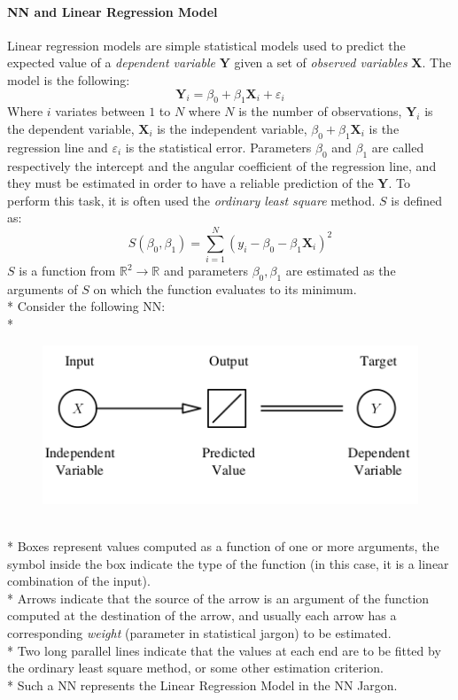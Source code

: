 \documentclass[10pt,a4paper]{article}
\begin{document}
	\paragraph{NN and Linear Regression Model}
	Linear regression models are simple statistical models used to predict the expected value of a \emph{dependent variable} $\textbf{Y}$ given a set of \emph{observed variables} $\textbf{X}$. The model is the following:
	$$
	\textbf{Y}_i = \beta_0 + \beta_1 \textbf{X}_i + \varepsilon_i
	$$
	Where $i$ variates between $1$ to $N$ where $N$ is the number of observations, $\textbf{Y}_i$ is the dependent variable, $\textbf{X}_i$ is the independent variable, $\beta_0 + \beta_1 \textbf{X}_i$ is the regression line and $\varepsilon_i$ is the statistical error. Parameters $\beta_0$ and $\beta_1$ are called respectively the intercept and the angular coefficient of the regression line, and they must be estimated in order to have a reliable prediction of the $\textbf{Y}$. To perform this task, it is often used the \emph{ordinary least square} method. $S$ is defined as:
	$$
	S(\beta_0,\beta_1) = \sum_{i=1}^N (y_i - \beta_0 - \beta_1 \textbf{X}_i)^2
	$$
	$S$ is a function from $\mathbb{R}^2 \rightarrow \mathbb{R}$ and parameters $\beta_0,\beta_1$ are estimated  as the arguments of $S$ on which the function evaluates to its minimum.\\*
	Consider the following NN:\\*
	\begin{figure}[h!]
		\centering
		\includegraphics[scale=2.5]{img/linreg}
	\end{figure}\\*
	Boxes represent values computed as a function of one or more arguments, the symbol inside the box indicate the type of the function (in this case, it is a linear combination of the input).\\*
	Arrows indicate that the source of the arrow is an argument of the function computed at the destination of the arrow, and usually each arrow has a corresponding \emph{weight} (parameter in statistical jargon) to be estimated.\\*
	Two long parallel lines indicate that the values at each end are to be fitted by the ordinary least square method, or some other estimation criterion.\\*
	Such a NN represents the Linear Regression Model in the NN Jargon.
\end{document}
